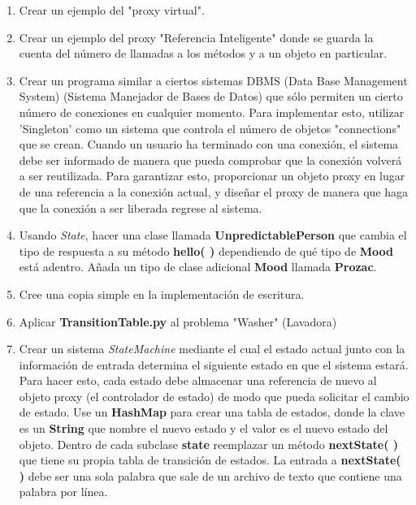 \begin{enumerate}
    
    \item Crear un ejemplo del "proxy virtual".
    
    \item Crear un ejemplo del proxy "Referencia Inteligente" donde se guarda la cuenta del número de llamadas a los métodos y a un objeto en particular.
    
    \item Crear un programa similar a ciertos sistemas DBMS (Data Base Management System) (Sistema Manejador de Bases de Datos) que sólo permiten un cierto número de conexiones en cualquier momento. Para implementar esto, utilizar 'Singleton' como un sistema que controla el número de objetos "connections" que se crean. Cuando un usuario ha terminado con una conexión, el sistema debe ser informado de manera que pueda comprobar que la conexión volverá a ser reutilizada. Para garantizar esto, proporcionar un objeto proxy en lugar de una referencia a la conexión actual, y diseñar el proxy de manera que haga que la conexión a ser liberada regrese al sistema.
    
    \item Usando \textit{State}, hacer una clase llamada \textbf{UnpredictablePerson} que cambia el tipo de respuesta a su método \textbf{hello( )} dependiendo de qué tipo de \textbf{Mood} está adentro. Añada un tipo de clase adicional \textbf{Mood} llamada \textbf{Prozac}. 
    
    \item Cree una copia simple en la implementación de escritura.
    
    \item Aplicar \textbf{TransitionTable.py} al problema "Washer" (Lavadora)
    
    \item Crear un sistema \textit{StateMachine} mediante el cual el estado actual junto con la información de entrada determina el siguiente estado en que el sistema estará. Para hacer esto, cada estado debe almacenar una referencia de nuevo al objeto proxy (el controlador de estado) de modo que pueda solicitar el cambio de estado. Use un \textbf{HashMap} para crear una tabla de estados, donde la clave es un \textbf{String} que nombre el nuevo estado y el valor es el nuevo estado del objeto. Dentro de cada subclase \textbf{state} reemplazar un método \textbf{nextState( )} que tiene su propia tabla de transición de estados. La entrada a \textbf{nextState( )} debe ser una sola palabra que sale de un archivo de texto que contiene una palabra por línea.
    

\end{enumerate}
